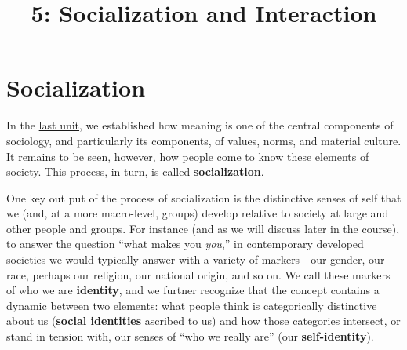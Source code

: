 \documentclass[
  letterpaper,
  DIV=11,
  numbers=noendperiod,
  oneside]{scrartcl}
\title{5: Socialization and Interaction}
\author{}
\date{}
\begin{document}
\maketitle


\section{Socialization}\label{socialization}

In the \href{../chapters/Ch_4_Meaning.qmd}{last unit}, we established
how meaning is one of the central components of sociology, and
particularly its components, of values, norms, and material culture. It
remains to be seen, however, how people come to know these elements of
society. This process, in turn, is called \textbf{socialization}.


One key out put of the process of socialization is the distinctive
senses of self that we (and, at a more macro-level, groups) develop
relative to society at large and other people and groups. For instance
(and as we will discuss later in the course), to answer the question
``what makes you \emph{you},'' in contemporary developed societies we
would typically answer with a variety of markers---our gender, our race,
perhaps our religion, our national origin, and so on. We call these
markers of who we are \textbf{identity}, and we furtner recognize that
the concept contains a dynamic between two elements: what people think
is categorically distinctive about us (\textbf{social identities}
ascribed to us) and how those categories intersect, or stand in tension
with, our senses of ``who we really are'' (our \textbf{self-identity}).

\end{document}

